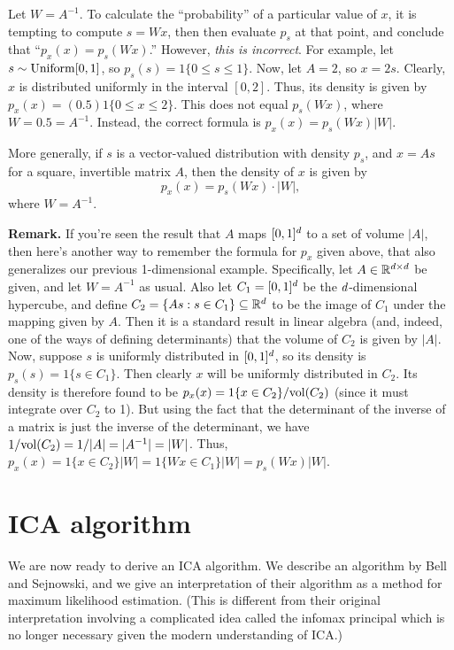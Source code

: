 \documentclass{article}
\begin{document}
Let $W = A^{-1}$.  To calculate the ``probability'' of a particular value of $x$,
it is tempting to compute $s = Wx$, then then evaluate $p_s$ at that point, and conclude
that ``$p_x(x) = p_s(Wx)$.''  However, \emph{this is incorrect}.
For example, let $s \sim {\rm Uniform}[0,1]$, so $p_s(s) = 1\{0 \leq s \leq 1\}$. Now,
let $A=2$, so $x = 2s$.  Clearly, $x$ is distributed uniformly in the interval $[0,2]$.
Thus, its density is given by $p_x(x) = (0.5) 1\{0 \leq x \leq 2\}$.  This does not equal
$p_s(Wx)$, where $W = 0.5 = A^{-1}$.  Instead, the correct formula is $p_x(x) = p_s(Wx) |W|$.

More generally, if $s$ is a vector-valued distribution with density $p_s$, and $x = As$ for
a square, invertible matrix $A$, then the density of $x$ is given by
\[
p_x(x) = p_s(Wx)\cdot |W|,
\]
where $W = A^{-1}$.

\medskip
\noindent
{\bf Remark.}  If you're seen the result that $A$ maps $[0,1]^{d}$ to a set of volume $|A|$,
then here's another way to remember the formula for $p_x$ given above, that also
generalizes our previous 1-dimensional example.  Specifically, let $A\in {\mathbb R}^{{d}\times {d}}$ be
given, and let $W = A^{-1}$ as usual.
Also let $C_1 = [0,1]^{d}$ be the ${d}$-dimensional hypercube, and define
$C_2 = \{ As : s \in C_1\} \subseteq {\mathbb R}^{d}$ to be the image of $C_1$ under the mapping given by $A$. Then it is
a standard result in linear algebra (and, indeed, one of the ways of defining determinants)
that the volume of $C_2$ is given by $|A|$.  Now, suppose $s$ is uniformly distributed in
$[0,1]^{d}$, so its density is $p_s(s) = 1\{s \in C_1\}$.  Then clearly $x$ will be uniformly
distributed in $C_2$.  Its density is therefore found to be $p_x(x) = 1\{x \in C_2\}/{\rm vol}(C_2)$
(since it must integrate over $C_2$ to 1).  But using the fact that the determinant of the
inverse of a matrix is just the inverse of the determinant, we have $1/{\rm vol}(C_2) = 1/|A|= |A^{-1}|=|W|$.
Thus, $p_x(x) = 1\{x \in C_2\}|W| = 1\{Wx \in C_1\}|W| = p_s(Wx)|W|$.


\section{ICA algorithm}
We are now ready to derive an ICA algorithm.  We describe an algorithm by Bell and
Sejnowski, and we give an interpretation of their algorithm as a method for
maximum likelihood estimation.  (This is different from their original interpretation
involving a complicated idea called the infomax principal which is no longer
necessary given the modern understanding of ICA.)
\end{document}
